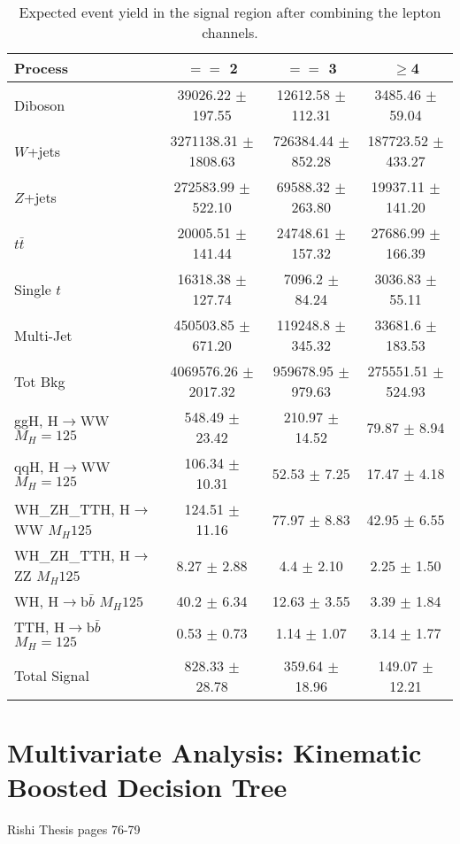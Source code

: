 \begin{table}[htbp]
  \centering
  \noindent
  \small
    \begin{tabular}{|l|c|c|c|} \hline \hline
Process & $==$ 2 & $==$ 3 &  $\geq$4 \\ \hline
Diboson  & 39026.22 $\pm$ 197.55 & 12612.58 $\pm$ 112.31 & 3485.46 $\pm$ 59.04 \\
$W$+jets  & 3271138.31 $\pm$ 1808.63 & 726384.44 $\pm$ 852.28 & 187723.52 $\pm$ 433.27 \\
$Z$+jets  & 272583.99 $\pm$ 522.10 & 69588.32 $\pm$  263.80 & 19937.11 $\pm$ 141.20 \\
$t\bar{t}$  & 20005.51 $\pm$ 141.44 & 24748.61 $\pm$ 157.32 & 27686.99 $\pm$ 166.39 \\
Single $t$ & 16318.38 $\pm$ 127.74 & 7096.2 $\pm$ 84.24 & 3036.83 $\pm$ 55.11 \\
Multi-Jet  & 450503.85 $\pm$ 671.20 & 119248.8 $\pm$ 345.32 & 33681.6 $\pm$ 183.53 \\ \hline
Tot Bkg & 4069576.26 $\pm$ 2017.32 & 959678.95 $\pm$ 979.63 & 275551.51 $\pm$ 524.93 \\\hline \hline
ggH, H$\rightarrow$WW $M_{H}=125$  & 548.49 $\pm$ 23.42 & 210.97 $\pm$ 14.52 & 79.87 $\pm$ 8.94 \\
qqH, H$\rightarrow$WW $M_{H}=125$  & 106.34 $\pm$ 10.31 & 52.53 $\pm$ 7.25 & 17.47 $\pm$ 4.18\\
WH\_ZH\_TTH, H$\rightarrow$WW $M_{H}125$ & 124.51 $\pm$ 11.16 & 77.97 $\pm$ 8.83 & 42.95 $\pm$ 6.55\\
WH\_ZH\_TTH, H$\rightarrow$ZZ $M_{H}125$ & 8.27 $\pm$ 2.88 & 4.4 $\pm$ 2.10 & 2.25 $\pm$ 1.50\\
WH, H$\rightarrow$b$\bar{b}$ $M_{H}125$ & 40.2 $\pm$ 6.34 & 12.63 $\pm$ 3.55 & 3.39 $\pm$ 1.84\\
TTH, H$\rightarrow$b$\bar{b}$ $M_{H}=125$ & 0.53 $\pm$ 0.73 & 1.14 $\pm$ 1.07 & 3.14 $\pm$ 1.77 \\ \hline
Total Signal & 828.33 $\pm$ 28.78 & 359.64 $\pm$ 18.96 & 149.07 $\pm$ 12.21 \\ \hline
    \end{tabular}
    \caption{Expected event yield in the signal region after combining the lepton channels.}
    \label{tab:FinalYields}
\end{table}

\section{Multivariate Analysis: Kinematic Boosted Decision Tree}
Rishi Thesis pages 76-79
